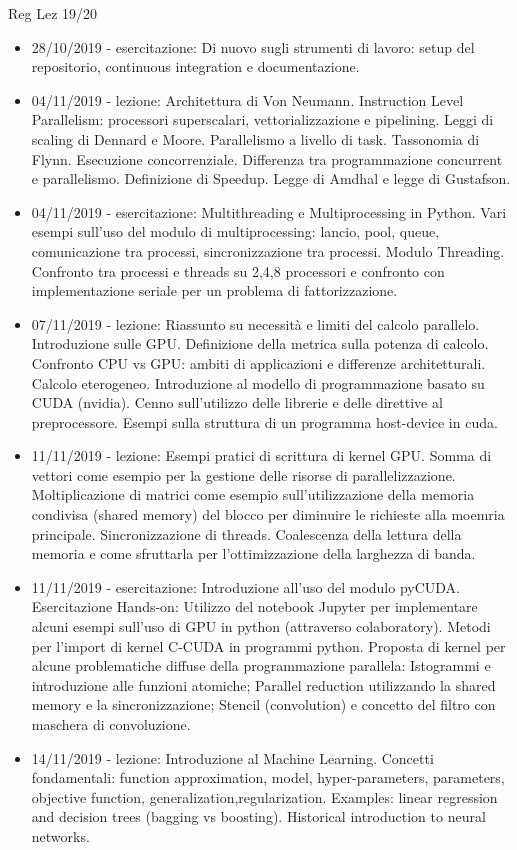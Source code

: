 \begin{frame}[allowframebreaks]{Reg Lez 19/20}
\begin{itemize}
\item 28/10/2019 - esercitazione: Di nuovo sugli strumenti di lavoro: setup del repositorio, continuous integration e documentazione.
\item 04/11/2019 - lezione: Architettura di Von Neumann. Instruction Level Parallelism: processori superscalari, vettorializzazione e pipelining. Leggi di scaling di Dennard e Moore. Parallelismo a livello di task. Tassonomia di Flynn. Esecuzione concorrenziale. Differenza tra programmazione concurrent e parallelismo. Definizione di Speedup. Legge di Amdhal e legge di Gustafson.
\item 04/11/2019 - esercitazione: Multithreading e Multiprocessing in Python. Vari esempi sull'uso del modulo di multiprocessing: lancio, pool, queue, comunicazione tra processi, sincronizzazione tra processi. Modulo Threading. Confronto tra processi e threads su 2,4,8 processori e confronto con implementazione seriale per un problema di fattorizzazione.
\item 07/11/2019 - lezione: Riassunto su necessità e limiti del calcolo parallelo. Introduzione sulle GPU. Definizione della metrica sulla potenza di calcolo. Confronto CPU vs GPU: ambiti di applicazioni e differenze architetturali. Calcolo eterogeneo. Introduzione al modello di programmazione basato su CUDA (nvidia). Cenno sull'utilizzo delle librerie e delle direttive al preprocessore. Esempi sulla struttura di un programma host-device in cuda.
\item 11/11/2019 - lezione: Esempi pratici di scrittura di kernel GPU. Somma di vettori come esempio per la gestione delle risorse di parallelizzazione. Moltiplicazione di matrici come esempio sull'utilizzazione della memoria condivisa (shared memory) del blocco per diminuire le richieste alla moemria principale. Sincronizzazione di threads. Coalescenza della lettura della memoria e come sfruttarla per l'ottimizzazione della larghezza di banda.
\item 11/11/2019 - esercitazione: Introduzione all'uso del modulo pyCUDA. Esercitazione Hands-on: Utilizzo del notebook Jupyter per implementare alcuni esempi sull'uso di GPU in python (attraverso colaboratory). Metodi per l'import di kernel C-CUDA in programmi python. Proposta di kernel per alcune problematiche diffuse della programmazione parallela: Istogrammi e introduzione alle funzioni atomiche; Parallel reduction utilizzando la shared memory e la sincronizzazione; Stencil (convolution) e concetto del filtro con maschera di convoluzione.
\item 14/11/2019 - lezione: Introduzione al Machine Learning. Concetti fondamentali: function approximation, model, hyper-parameters, parameters, objective function, generalization,regularization. Examples: linear regression and decision trees (bagging vs boosting). Historical introduction to neural networks.
\end{itemize}
\end{frame}